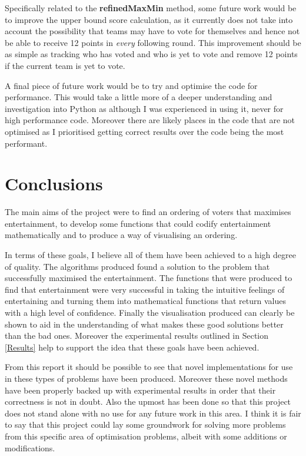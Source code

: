 \documentclass[12pt]{report}
\begin{document}
Specifically related to the \textbf{refinedMaxMin} method, some future work would be to improve the upper bound score calculation, as it currently does not take into account the possibility that teams may have to vote for themselves and hence not be able to receive 12 points in \textit{every} following round. This improvement should be as simple as tracking who has voted and who is yet to vote and remove 12 points if the current team is yet to vote.

A final piece of future work would be to try and optimise the code for performance. This would take a little more of a deeper understanding and investigation into Python as although I was experienced in using it, never for high performance code. Moreover there are likely places in the code that are not optimised as I prioritised getting correct results over the code being the most performant.

\section{Conclusions}\label{Conclusions}
The main aims of the project were to find an ordering of voters that maximises entertainment, to develop some functions that could codify entertainment mathematically and to produce a way of visualising an ordering.

In terms of these goals, I believe all of them have been achieved to a high degree of quality. The algorithms produced found a solution to the problem that successfully maximised the entertainment. The functions that were produced to find that entertainment were very successful in taking the intuitive feelings of entertaining and turning them into mathematical functions that return values with a high level of confidence. Finally the visualisation produced can clearly be shown to aid in the understanding of what makes these good solutions better than the bad ones. Moreover the experimental results outlined in Section \ref{Results} help to support the idea that these goals have been achieved.

From this report it should be possible to see that novel implementations for use in these types of problems have been produced. Moreover these novel methods have been properly backed up with experimental results in order that their correctness is not in doubt. Also the upmost has been done so that this project does not stand alone with no use for any future work in this area. I think it is fair to say that this project could lay some groundwork for solving more problems from this specific area of optimisation problems, albeit with some additions or modifications.
\end{document}
